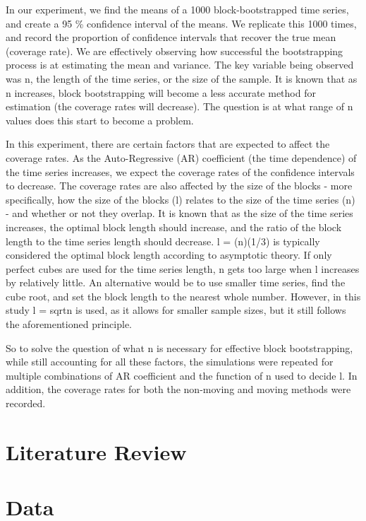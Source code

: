 \documentclass[12pt, letterpaper, titlepage]{article}
\begin{document}
In our experiment, we find the means of a 1000 block-bootstrapped time series, 
and create a 95 \% confidence interval of the means. We replicate this 1000 times, 
and record the proportion of confidence intervals that recover the true mean 
(coverage rate). We are effectively observing how successful the bootstrapping process
is at estimating the mean and variance. The key variable being observed was n, 
the length of the time series, or the size of the sample. It is known that as n
increases, block bootstrapping will become a less accurate method for estimation
(the coverage rates will decrease). The question is at what range of n values does this
start to become a problem. 

In this experiment, there are certain factors that are expected to affect the coverage
rates. As the Auto-Regressive (AR) coefficient (the time dependence) of the time series 
increases,
we expect the coverage rates of the confidence intervals to decrease.
The coverage rates are also affected by the size of the blocks - more specifically,
how the size of the blocks (l) relates to the size of the time series (n) - 
and whether or not they overlap. It is known that as the size of the time series 
increases, the optimal block length should increase, and the ratio of the block length to 
the time series length should decrease. l = (n)(1/3) is typically considered the optimal 
block length according to asymptotic theory. If only perfect cubes are used for the time 
series length, n gets too large when l increases by relatively little. An alternative 
would be to use smaller time series, find the cube root, and set the block length to the 
nearest whole number. However, in this study l = sqrt{n} is used, as it allows for smaller 
sample sizes, but it still follows the aforementioned principle.

So to solve the question of what n is necessary for effective block bootstrapping,
while still accounting for all these factors, the simulations were repeated for
multiple combinations of AR coefficient and the function of n used to decide l. In 
addition, the coverage rates
for both the non-moving and moving methods were recorded.

\section{Literature Review}
\label{sec:litreview}




\section{Data}
\label{sec:data}
\end{document}
